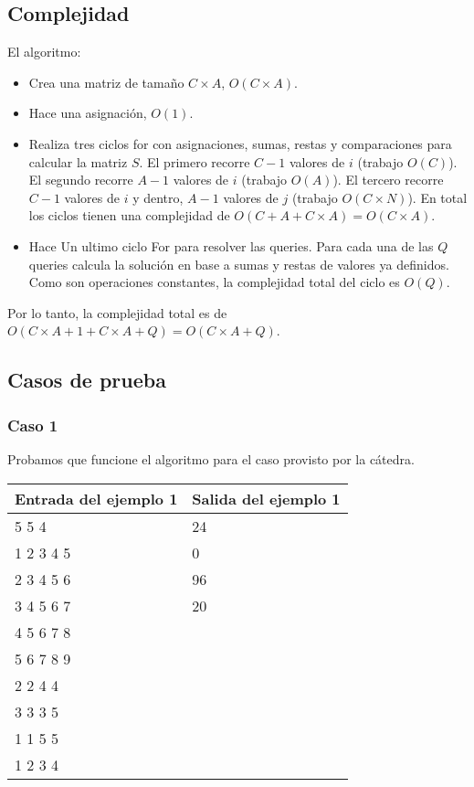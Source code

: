 \subsection{Complejidad}

El algoritmo:
\begin{itemize}
	\item Crea una matriz de tamaño $C \times A$, $O(C \times A)$.
	\item Hace una asignación, $O(1)$.
	\item Realiza tres ciclos for con asignaciones, sumas, restas y comparaciones para calcular la matriz $S$. El primero 
	recorre $C-1$ valores de $i$ (trabajo $O(C)$). El segundo recorre $A-1$ valores de $i$ (trabajo $O(A)$). El 
	tercero recorre $C-1$ valores de $i$ y dentro, $A-1$ valores de $j$ (trabajo $O(C \times N)$). En total los
	ciclos tienen una complejidad de $O(C + A + C \times A) = O(C \times A)$.
	\item Hace Un ultimo ciclo For para resolver las queries. Para cada una de las $Q$ queries calcula la solución en
	base a sumas y restas de valores ya definidos. Como son operaciones constantes, la complejidad total del ciclo es $O(Q)$.
\end{itemize}

Por lo tanto, la complejidad total es de $O(C \times A + 1 + C \times A + Q) = O(C \times A + Q)$.

\subsection{Casos de prueba}

\subsubsection*{Caso 1}

Probamos que funcione el algoritmo para el caso provisto por la cátedra.

\begin{center}
    \begin{tabular}{| l | l |}
    \hline
    Entrada del ejemplo 1 & Salida del ejemplo 1  \\ \hline
    5 5 4 & 24 \\
	1 2 3 4 5 & 0 \\
	2 3 4 5 6 & 96 \\
	3 4 5 6 7 & 20 \\
	4 5 6 7 8 & \\
	5 6 7 8 9 & \\
	2 2 4 4  & \\
	3 3 3 5  & \\
	1 1 5 5  & \\
	1 2 3 4  & \\
	\hline
    \end{tabular}
\end{center}

